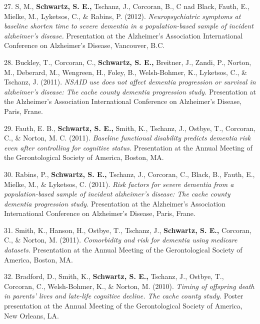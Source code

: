 \documentclass[11pt,a4paper,]{moderncv}
\newlength{\cslhangindent}
\newenvironment{CSLReferences}[2] %
 {\begin{list}{}{%
  \setlength{\itemindent}{0pt}
  \setlength{\leftmargin}{0pt}
  \setlength{\parsep}{0pt}
  \ifodd #1
   \setlength{\leftmargin}{\cslhangindent}
   \setlength{\itemindent}{-1\cslhangindent}
  \fi
  \setlength{\itemsep}{#2\baselineskip}}}
 {\end{list}}
\begin{document}
\begin{CSLReferences}{1}{0}
27. S, M., \textbf{Schwartz, S. E.,} Tschanz, J., Corcoran, B., C nad
Black, Fauth, E., Mielke, M., Lyketsos, C., \& Rabins, P. (2012).
\emph{Neuropsychiatric symptoms at baseline shorten time to severe
dementia in a population-based sample of incident alzheimer's disease.}
Presentation at the Alzheimer's Association International Conference on
Alzheimer's Disease, Vancouver, B.C.

28. Buckley, T., Corcoran, C., \textbf{Schwartz, S. E.,} Breitner, J.,
Zandi, P., Norton, M., Deberard, M., Wengreen, H., Foley, B.,
Welsh-Bohmer, K., Lyketsos, C., \& Tschanz, J. (2011). \emph{NSAID use
does not affect dementia progression or survival in alzheimer's disease:
The cache county dementia progression study.} Presentation at the
Alzheimer's Association International Conference on Alzheimer's Disease,
Paris, Frane.

29. Fauth, E. B., \textbf{Schwartz, S. E.,} Smith, K., Tschanz, J.,
Ostbye, T., Corcoran, C., \& Norton, M. C. (2011). \emph{Baseline
functional disability predicts dementia risk even after controlling for
cognitive status.} Presentation at the Annual Meeting of the
Gerontological Society of America, Boston, MA.

30. Rabins, P., \textbf{Schwartz, S. E.,} Tschanz, J., Corcoran, C.,
Black, B., Fauth, E., Mielke, M., \& Lyketsos, C. (2011). \emph{Risk
factors for severe dementia from a population-based sample of incident
alzheimer's disease: The cache county dementia progression study.}
Presentation at the Alzheimer's Association International Conference on
Alzheimer's Disease, Paris, Frane.

31. Smith, K., Hanson, H., Ostbye, T., Tschanz, J.,
\textbf{Schwartz, S. E.,} Corcoran, C., \& Norton, M. (2011).
\emph{Comorbidity and risk for dementia using medicare datasets.}
Presentation at the Annual Meeting of the Gerontological Society of
America, Boston, MA.

32. Bradford, D., Smith, K., \textbf{Schwartz, S. E.,} Tschanz, J.,
Ostbye, T., Corcoran, C., Welsh-Bohmer, K., \& Norton, M. (2010).
\emph{Timing of offspring death in parents' lives and late-life
cognitive decline. The cache county study.} Poster presentation at the
Annual Meeting of the Gerontological Society of America, New Orleans,
LA.


\end{CSLReferences}
\end{document}
